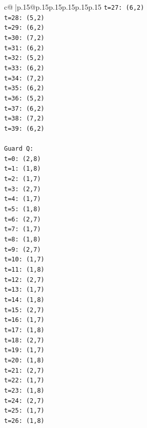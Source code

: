 \documentclass{article}
\begin{document}
{\begin{supertabular}{c@{$\;$}|p{.15\linewidth}@{}p{.15\linewidth}p{.15\linewidth}p{.15\linewidth}p{.15\linewidth}p{.15\linewidth}}
{{{\texttt{t=27: (6,2)} \\
\texttt{t=28: (5,2)} \\
\texttt{t=29: (6,2)} \\
\texttt{t=30: (7,2)} \\
\texttt{t=31: (6,2)} \\
\texttt{t=32: (5,2)} \\
\texttt{t=33: (6,2)} \\
\texttt{t=34: (7,2)} \\
\texttt{t=35: (6,2)} \\
\texttt{t=36: (5,2)} \\
\texttt{t=37: (6,2)} \\
\texttt{t=38: (7,2)} \\
\texttt{t=39: (6,2)} \\
\\ 
\texttt{Guard Q:} \\
\texttt{t=0: (2,8)} \\
\texttt{t=1: (1,8)} \\
\texttt{t=2: (1,7)} \\
\texttt{t=3: (2,7)} \\
\texttt{t=4: (1,7)} \\
\texttt{t=5: (1,8)} \\
\texttt{t=6: (2,7)} \\
\texttt{t=7: (1,7)} \\
\texttt{t=8: (1,8)} \\
\texttt{t=9: (2,7)} \\
\texttt{t=10: (1,7)} \\
\texttt{t=11: (1,8)} \\
\texttt{t=12: (2,7)} \\
\texttt{t=13: (1,7)} \\
\texttt{t=14: (1,8)} \\
\texttt{t=15: (2,7)} \\
\texttt{t=16: (1,7)} \\
\texttt{t=17: (1,8)} \\
\texttt{t=18: (2,7)} \\
\texttt{t=19: (1,7)} \\
\texttt{t=20: (1,8)} \\
\texttt{t=21: (2,7)} \\
\texttt{t=22: (1,7)} \\
\texttt{t=23: (1,8)} \\
\texttt{t=24: (2,7)} \\
\texttt{t=25: (1,7)} \\
\texttt{t=26: (1,8)} \\
}}}
\end{supertabular}}
\end{document}
